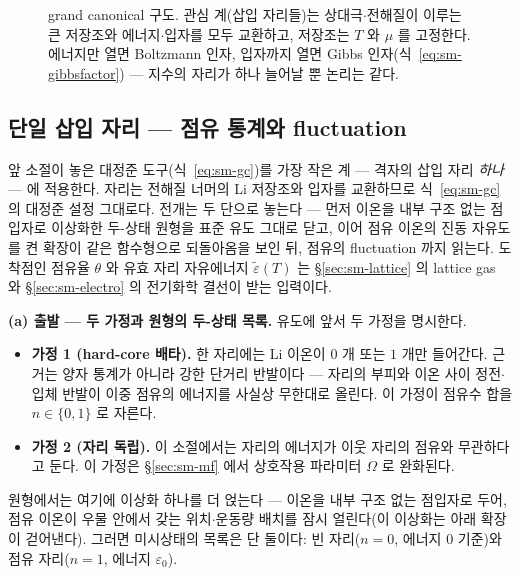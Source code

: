 \begin{figure}[t]
\centering
{}
\caption{grand canonical 구도. 관심 계(삽입 자리들)는 상대극$\cdot$전해질이 이루는 큰 저장조와
에너지$\cdot$입자를 모두 교환하고, 저장조는 $T$ 와 $\mu$ 를 고정한다. 에너지만 열면 Boltzmann 인자, 입자까지
열면 Gibbs 인자(식~\eqref{eq:sm-gibbsfactor}) --- 지수의 자리가 하나 늘어날 뿐 논리는 같다.}
\label{fig:sm-reservoir}
\end{figure}

\subsection{단일 삽입 자리 --- 점유 통계와 fluctuation}\label{sec:sm-site}
앞 소절이 놓은 대정준 도구(식~\eqref{eq:sm-gc})를 가장 작은 계 --- 격자의 삽입 자리 \emph{하나} --- 에
적용한다. 자리는 전해질 너머의 Li 저장조와 입자를 교환하므로 식~\eqref{eq:sm-gc} 의 대정준 설정 그대로다.
전개는 두 단으로 놓는다 --- 먼저 이온을 내부 구조 없는 점입자로 이상화한 두-상태 원형을 표준 유도
그대로 닫고, 이어 점유 이온의 진동 자유도를 켠 확장이 같은 함수형으로 되돌아옴을 보인 뒤, 점유의
fluctuation 까지 읽는다. 도착점인 점유율 $\theta$ 와 유효 자리 자유에너지 $\tilde\varepsilon(T)$ 는
\S\ref{sec:sm-lattice} 의 lattice gas 와 \S\ref{sec:sm-electro} 의 전기화학 결선이 받는 입력이다.

\textbf{(a) 출발 --- 두 가정과 원형의 두-상태 목록.} 유도에 앞서 두 가정을 명시한다.
\begin{itemize}[leftmargin=2.2em,itemsep=0.1em]
\item \textbf{가정 1 (hard-core 배타).} 한 자리에는 Li 이온이 $0$ 개 또는 $1$ 개만 들어간다. 근거는 양자
통계가 아니라 강한 단거리 반발이다 --- 자리의 부피와 이온 사이 정전$\cdot$입체 반발이 이중 점유의
에너지를 사실상 무한대로 올린다. 이 가정이 점유수 합을 $n\in\{0,1\}$ 로 자른다.
\item \textbf{가정 2 (자리 독립).} 이 소절에서는 자리의 에너지가 이웃 자리의 점유와 무관하다고 둔다.
이 가정은 \S\ref{sec:sm-mf} 에서 상호작용 파라미터 $\Omega$ 로 완화된다.
\end{itemize}
원형에서는 여기에 이상화 하나를 더 얹는다 --- 이온을 내부 구조 없는 점입자로 두어, 점유 이온이 우물
안에서 갖는 위치$\cdot$운동량 배치를 잠시 얼린다(이 이상화는 아래 확장이 걷어낸다). 그러면 미시상태의
목록은 단 둘이다: 빈 자리($n=0$, 에너지 $0$ 기준)와 점유 자리($n=1$, 에너지 $\varepsilon_0$).

